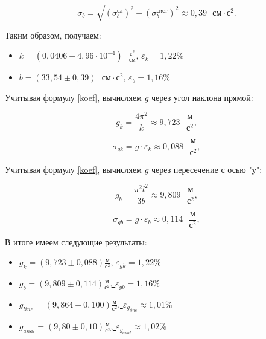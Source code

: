 	\begin{equation}
		\sigma_b = \sqrt{\left( \sigma_b^\text{сл} \right)^2 + \left( \sigma_b^\text{сист} \right)^2 } \approx 0,39 \text{ }\text{см}\cdot\text{с}^2.
	\end{equation}
	
	Таким образом, получаем:
	\begin{itemize}
		\item $ k = \left( 0,0406\pm 4,96\cdot10^{-4}\right)  \text{ }\frac{\text{с}^2}{\text{см}} $, $ \varepsilon_k = 1,22 \% $
		\item $ b = \left( 33,54\pm 0,39 \right)  \text{ }\text{см}\cdot\text{с}^2 $, $ \varepsilon_b = 1,16 \% $
	\end{itemize}
	
	Учитывая формулу \eqref{koef}, вычисляем $ g $ через угол наклона прямой:
	
	\begin{equation}
		g_k = \frac{4\pi^2}{k} \approx 9,723  \text{ }\frac{\text{м}}{\text{с}^2},
	\end{equation}
	
	\begin{equation}
		\sigma_{gk} = g\cdot\varepsilon_k \approx 0,088 \text{ }\frac{\text{м}}{\text{с}^2},
	\end{equation}
	
	
	
	Учитывая формулу \eqref{koef}, вычисляем $ g $ через пересечение с осью "y":
	
	\begin{equation}
		g_b = \frac{\pi^2l^2}{3b} \approx 9,809  \text{ }\frac{\text{м}}{\text{с}^2},
	\end{equation}
	
	\begin{equation}
		\sigma_{gb} = g\cdot\varepsilon_b \approx 0,114 \text{ }\frac{\text{м}}{\text{с}^2},
	\end{equation}
	
	
	
	В итоге имеем следующие результаты:
	
	\begin{itemize}
		
		\item \underline{$ g_k = \left( 9,723\pm 0,088\right) \frac{\text{м}}{\text{с}^2} $, $ \varepsilon_{gk} = 1,22\% $}
		
		\item \underline{$ g_b = \left( 9,809\pm 0,114\right) \frac{\text{м}}{\text{с}^2} $, $ \varepsilon_{gb} = 1,16\% $}
		
		\item \underline{$ g_{line}= \left( 9,864\pm 0,100\right) \frac{\text{м}}{\text{с}^2} $, $ \varepsilon_{g_{line}} \approx 1,01\% $}
		
		\item \underline{$ g_{anal}= \left( 9,80\pm 0,10\right) \frac{\text{м}}{\text{с}^2} $, $ \varepsilon_{g_{anal}} \approx 1,02\% $}
		
	\end{itemize}
	
